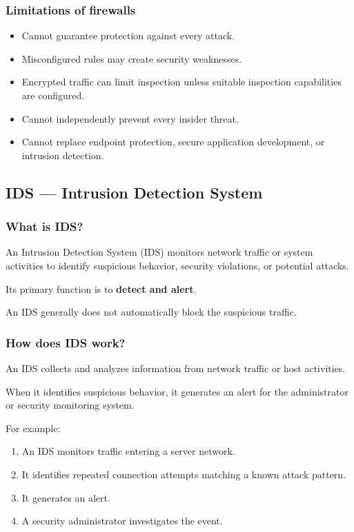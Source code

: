 \subsubsection{Limitations of firewalls}

\begin{itemize}
\item Cannot guarantee protection against every attack.
\item Misconfigured rules may create security weaknesses.
\item Encrypted traffic can limit inspection unless suitable inspection capabilities are configured.
\item Cannot independently prevent every insider threat.
\item Cannot replace endpoint protection, secure application development, or intrusion detection.
\end{itemize}

\subsection{IDS --- Intrusion Detection System}

\subsubsection{What is IDS?}

An Intrusion Detection System (IDS) monitors network traffic or system activities to identify suspicious behavior, security violations, or potential attacks.

Its primary function is to \textbf{detect and alert}.

An IDS generally does not automatically block the suspicious traffic.

\subsubsection{How does IDS work?}

An IDS collects and analyzes information from network traffic or host activities.

When it identifies suspicious behavior, it generates an alert for the administrator or security monitoring system.

For example:

\begin{enumerate}
\item An IDS monitors traffic entering a server network.
\item It identifies repeated connection attempts matching a known attack pattern.
\item It generates an alert.
\item A security administrator investigates the event.
\end{enumerate}

